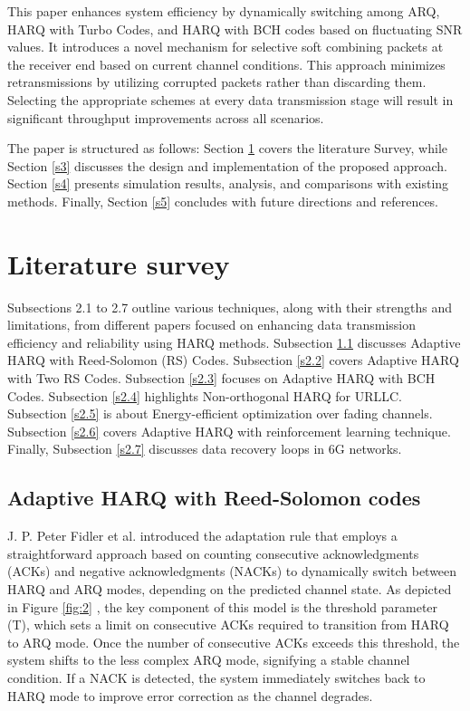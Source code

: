 \documentclass[sn-mathphys-num]{sn-jnl}
\theoremstyle{thmstyleone}
\theoremstyle{thmstyletwo}%
\theoremstyle{thmstylethree}%
\begin{document}
This paper enhances system efficiency by dynamically switching among ARQ, HARQ with Turbo Codes, and HARQ with BCH codes based on fluctuating SNR values. It introduces a novel mechanism for selective soft combining packets at the receiver end based on current channel conditions. This approach minimizes retransmissions by utilizing corrupted packets rather than discarding them. Selecting the appropriate schemes at every data transmission stage will result in significant throughput improvements across all scenarios. 

The paper is structured as follows: Section \ref{s2} covers the literature Survey, while Section \ref{s3} discusses the design and implementation of the proposed approach. Section \ref{s4} presents simulation results, analysis, and comparisons with existing methods. Finally, Section \ref{s5} concludes with future directions and references.

\section{Literature survey} \label{s2}

Subsections 2.1 to 2.7 outline various techniques, along with their strengths and limitations, from different papers focused on enhancing data transmission efficiency and reliability using HARQ methods. Subsection \ref{s2.1} discusses Adaptive HARQ with Reed-Solomon (RS) Codes. Subsection \ref{s2.2} covers Adaptive HARQ with Two RS Codes. Subsection \ref{s2.3} focuses on Adaptive HARQ with BCH Codes. Subsection \ref{s2.4} highlights Non-orthogonal HARQ for URLLC. Subsection \ref{s2.5} is about Energy-efficient optimization over fading channels. Subsection \ref{s2.6} covers Adaptive HARQ with reinforcement learning technique. Finally, Subsection \ref{s2.7} discusses data recovery loops in 6G networks.

\subsection{Adaptive HARQ with Reed-Solomon codes} \label{s2.1}

J. P. Peter Fidler et al. \cite{r6} introduced the adaptation rule that employs a straightforward approach based on counting consecutive acknowledgments (ACKs) and negative acknowledgments (NACKs) to dynamically switch between HARQ and ARQ modes, depending on the predicted channel state. As depicted in  Figure \ref{fig:2} \cite{r6}, the key component of this model is the threshold parameter (T), which sets a limit on consecutive ACKs required to transition from HARQ to ARQ mode. Once the number of consecutive ACKs exceeds this threshold, the system shifts to the less complex ARQ mode, signifying a stable channel condition. If a NACK is detected, the system immediately switches back to HARQ mode to improve error correction as the channel degrades.
\end{document}
